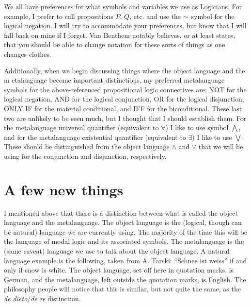 \begin{center}  
     
\end{center}

We all have preferences for what symbols and variables we use as Logicians. 
For example, I prefer to call propositions $P$, $Q$, etc. and use the $\mathord{\sim}$ symbol for the logical negation. 
I will try to accommodate your preferences, but know that I will fall back on mine if I forget. 
Van Benthem notably believes, or at least states, that you should be able to change notation for these sorts 
of things as one changes clothes. 

Additionally, when we begin discussing things where the object language and the m
etalanguage become important distinctions, my preferred metalanguage symbols for 
the above-referenced propositional logic connectives are: NOT for the logical negation, AND for 
the logical conjunction, OR for the logical disjunction, ONLY IF for the material conditional, and IFF 
for the biconditional. These last two are unlikely to be seen much, but I thought that I should establish them. 
For the metalanguage universal quantifier (equivalent to $\forall$) I like to use symbol $\bigwedge$, and for the 
metalanguage existential quantifier (equivalent to $\exists$) I like to use $\bigvee$. These should be distinguished
from the object language $\wedge$ and $\vee$ that we will be using for the conjunction and disjunction, respectively.

\section{A few new things}

I mentioned above that there is a distinction between what is called the object language and the metalanguage. 
The object language is the (logical, though can be natural) language we are currently using. 
The majority of the time this will be the language of modal logic and its associated symbols. 
The metalanguage is the (same caveat) language we use to talk about the object language. 
A natural language example is the following, taken from A. Tarski: “Schnee ist weiss” if and only if snow is white. 
The object language, set off here in quotation marks, is German, and the metalanguage, 
left outside the quotation marks, is English. The philosophy people will notice that this is similar, 
but not quite the same, as the \emph{de dicto}/\emph{de re} distinction.

